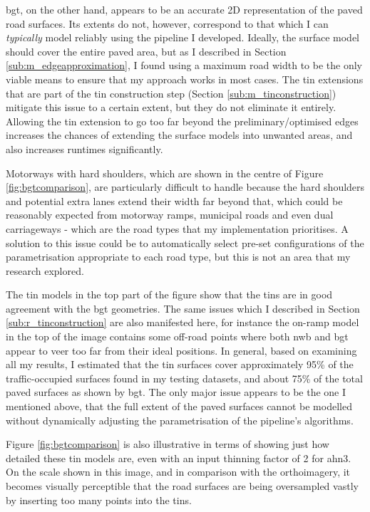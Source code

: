 \ac{bgt}, on the other hand, appears to be an accurate 2D representation of the paved road surfaces. Its extents do not, however, correspond to that which I can \textit{typically} model reliably using the pipeline I developed. Ideally, the surface model should cover the entire paved area, but as I described in Section \ref{sub:m_edgeapproximation}, I found using a maximum road width to be the only viable means to ensure that my approach works in most cases. The \ac{tin} extensions that are part of the \ac{tin} construction step (Section \ref{sub:m_tinconstruction}) mitigate this issue to a certain extent, but they do not eliminate it entirely. Allowing the \ac{tin} extension to go too far beyond the preliminary/optimised edges increases the chances of extending the surface models into unwanted areas, and also increases runtimes significantly.

Motorways with hard shoulders, which are shown in the centre of Figure \ref{fig:bgtcomparison}, are particularly difficult to handle because the hard shoulders and potential extra lanes extend their width far beyond that, which could be reasonably expected from motorway ramps, municipal roads and even dual carriageways - which are the road types that my implementation prioritises. A solution to this issue could be to automatically select pre-set configurations of the parametrisation appropriate to each road type, but this is not an area that my research explored.

The \ac{tin} models in the top part of the figure show that the \ac{tin}s are in good agreement with the \ac{bgt} geometries. The same issues which I described in Section \ref{sub:r_tinconstruction} are also manifested here, for instance the on-ramp model in the top of the image contains some off-road points where both \ac{nwb} and \ac{bgt} appear to veer too far from their ideal positions. In general, based on examining all my results, I estimated that the \ac{tin} surfaces cover approximately 95\% of the traffic-occupied surfaces found in my testing datasets, and about 75\% of the total paved surfaces as shown by \ac{bgt}. The only major issue appears to be the one I mentioned above, that the full extent of the paved surfaces cannot be modelled without dynamically adjusting the parametrisation of the pipeline's algorithms.

Figure \ref{fig:bgtcomparison} is also illustrative in terms of showing just how detailed these \ac{tin} models are, even with an input thinning factor of 2 for \ac{ahn3}. On the scale shown in this image, and in comparison with the orthoimagery, it becomes visually perceptible that the road surfaces are being oversampled vastly by inserting too many points into the \ac{tin}s.

